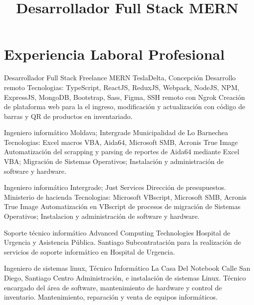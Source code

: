 \documentclass[draft,color,12pt,letterpaper,sans]{moderncv}
\title{Desarrollador Full Stack MERN}
\begin{document}
\makecvtitle %

\section{Experiencia Laboral Profesional}
{Desarrollador Full Stack Freelance MERN}
{TeslaDelta, Concepci\'on}
{\newline Desarrollo remoto}
{\newline Tecnologias: TypeScript, ReactJS, ReduxJS, Webpack, NodeJS, NPM, ExpressJS, MongoDB, Bootstrap, Sass, Figma, SSH remoto con Ngrok}
{Creaci\'on de plataforma web para la el ingreso, modificaci\'on y actualizaci\'on con c\'odigo de barras y QR de productos en inventariado.\newline}

{Ingeniero inform\'atico}
{Moldava; Intergrade}
{Municipalidad de Lo Barnechea}
{\newline Tecnologias: Excel macros VBA, Aida64, Microsoft SMB, Acronis True Image}
{Automatizaci\'on del scrapping y parsing de reportes de Aida64 mediante Excel VBA; Migraci\'on de Sistemas Operativos; Instalaci\'on y administraci\'on de software y hardware.\newline}


{Ingeniero inform\'atico}
{Intergrade; Just Services}
{Direcci\'on de presupuestos. Ministerio de hacienda}
{\newline Tecnologias: Microsoft VBscript, Microsoft SMB, Acronis True Image}
{Automatizaci\'on en VBscript de procesos de migraci\'on de Sistemas Operativos; Instalacion y administraci\'on de software y hardware.\newline}

{Soporte t\'ecnico inform\'atico}
{Advanced Computing Technologies}
{Hospital de Urgencia y Asistencia P\'ublica. Santiago}
{}
{Subcontrataci\'on para la realizaci\'on de servicios de soporte inform\'atico en Hospital de Urgencia.\newline}

{Ingeniero de sistemas linux, T\'ecnico Inform\'atico}
{La Casa Del Notebook}
{Calle San Diego, Santiago Centro}
{}
{Administraci\'on, e instalaci\'on de sistemas Linux. T\'ecnico encargado del \'area de software, mantenimiento de hardware y control de inventario. Mantenimiento, reparaci\'on y venta de equipos inform\'aticos.\newline} 
\end{document}
